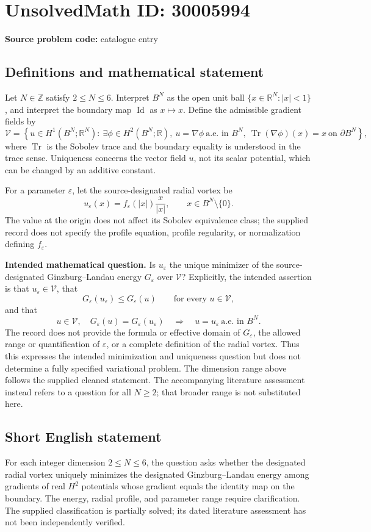 \documentclass[11pt]{article}
\newcommand{\Z}{\mathbb{Z}}
\newcommand{\R}{\mathbb{R}}
\begin{document}
\section*{UnsolvedMath ID: 30005994}
\textbf{Source problem code:} catalogue entry
\subsection{Definitions and mathematical statement}
Let \(N\in\Z\) satisfy \(2\leq N\leq6\). Interpret \(B^N\) as the open unit ball \(\{x\in\R^N:|x|<1\}\), and interpret the boundary map \(\operatorname{Id}\) as \(x\mapsto x\). Define the admissible gradient fields by
\[
\mathcal V=\left\{u\in H^1(B^N;\R^N):\ \exists\phi\in H^2(B^N;\R),\ u=\nabla\phi\ \text{a.e. in }B^N,\ \operatorname{Tr}(\nabla\phi)(x)=x\ \text{on }\partial B^N\right\},
\]
where \(\operatorname{Tr}\) is the Sobolev trace and the boundary equality is understood in the trace sense. Uniqueness concerns the vector field \(u\), not its scalar potential, which can be changed by an additive constant.

For a parameter \(\varepsilon\), let the source-designated radial vortex be
\[
u_\varepsilon(x)=f_\varepsilon(|x|)\frac{x}{|x|},\qquad x\in B^N\setminus\{0\}.
\]
The value at the origin does not affect its Sobolev equivalence class; the supplied record does not specify the profile equation, profile regularity, or normalization defining \(f_\varepsilon\).

\textbf{Intended mathematical question.} Is \(u_\varepsilon\) the unique minimizer of the source-designated Ginzburg--Landau energy \(G_\varepsilon\) over \(\mathcal V\)? Explicitly, the intended assertion is that \(u_\varepsilon\in\mathcal V\), that
\[
G_\varepsilon(u_\varepsilon)\leq G_\varepsilon(u)\qquad\text{for every }u\in\mathcal V,
\]
and that
\[
u\in\mathcal V,\quad G_\varepsilon(u)=G_\varepsilon(u_\varepsilon)
\quad\Longrightarrow\quad u=u_\varepsilon\ \text{a.e. in }B^N.
\]
The record does not provide the formula or effective domain of \(G_\varepsilon\), the allowed range or quantification of \(\varepsilon\), or a complete definition of the radial vortex. Thus this expresses the intended minimization and uniqueness question but does not determine a fully specified variational problem. The dimension range above follows the supplied cleaned statement. The accompanying literature assessment instead refers to a question for all \(N\geq2\); that broader range is not substituted here.
\subsection{Short English statement}
For each integer dimension \(2\leq N\leq6\), the question asks whether the designated radial vortex uniquely minimizes the designated Ginzburg--Landau energy among gradients of real \(H^2\) potentials whose gradient equals the identity map on the boundary. The energy, radial profile, and parameter range require clarification. The supplied classification is partially solved; its dated literature assessment has not been independently verified.
\end{document}
